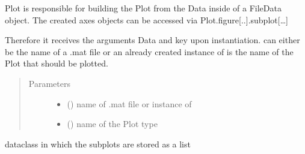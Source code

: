 \documentclass[letterpaper,10pt,english]{sphinxmanual}
\begin{document}
\begin{fulllineitems}
\label{\detokenize{DataAnalyzer.Plot:DataAnalyzer.Plot.cl_plot.Plot}}
Plot is responsible for building the Plot from the Data inside of a FileData object.
The created axes objects can be accessed via Plot.figure{[}..{]}.subplot{[}…{]}

Therefore it receives the arguments Data and key upon instantiation.
 can either be the name of a .mat file or an already created instance of 
 is the name of the Plot that should be plotted.
\begin{quote}\begin{description}
\item[{Parameters}] \leavevmode\begin{itemize}
\item {} 
 () \textendash{} name of .mat file or instance of 

\item {} 
 () \textendash{} name of the Plot type

\end{itemize}

\end{description}\end{quote}

\begin{fulllineitems}
\label{\detokenize{DataAnalyzer.Plot:DataAnalyzer.Plot.cl_plot.Plot.Subplot}}
dataclass in which the subplots are stored as a list

\end{fulllineitems}


\end{fulllineitems}
\end{document}
